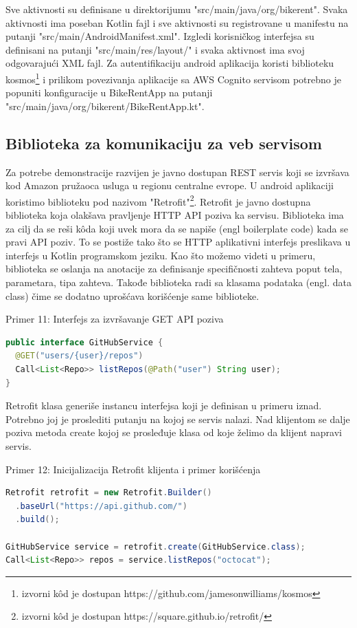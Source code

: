 \documentclass[12pt,oneside]{memoir}
\begin{document}
Sve aktivnosti su definisane u direktorijumu "src/main/java/org/bikerent". Svaka aktivnosti ima poseban Kotlin fajl i sve aktivnosti su registrovane u manifestu na putanji "src/main/AndroidManifest.xml". Izgledi korisničkog interfejsa su definisani na putanji "src/main/res/layout/" i svaka aktivnost ima svoj odgovarajući XML fajl. Za autentifikaciju android aplikacija koristi biblioteku kosmos\footnote{izvorni kôd je dostupan https://github.com/jamesonwilliams/kosmos} i prilikom povezivanja aplikacije sa AWS Cognito servisom potrebno je popuniti konfiguracije u BikeRentApp na putanji "src/main/java/org/bikerent/BikeRentApp.kt".
 
\subsection{Biblioteka za komunikaciju za veb servisom}
 
Za potrebe demonstracije razvijen je javno dostupan REST servis koji se izvršava kod Amazon pružaoca usluga u regionu centralne evrope. U android aplikaciji koristimo biblioteku pod nazivom "Retrofit"\footnote{izvorni kôd je dostupan https://square.github.io/retrofit/}. Retrofit je javno dostupna biblioteka koja olakšava pravljenje HTTP API poziva ka servisu. Biblioteka ima za cilj da se reši kôda koji uvek mora da se napiše (engl boilerplate code) kada se pravi API poziv. To se postiže tako što se HTTP aplikativni interfejs preslikava u interfejs u Kotlin programskom jeziku. Kao što možemo videti u primeru, biblioteka se oslanja na anotacije za definisanje specifičnosti zahteva poput tela, parametara, tipa zahteva. Takođe biblioteka radi sa klasama podataka (engl. data class) čime se dodatno uprošćava korišćenje same biblioteke.

\begin{center} Primer 11: Interfejs za izvršavanje GET API poziva\end{center}
\begin{lstlisting}[language=Java]
public interface GitHubService {
  @GET("users/{user}/repos")
  Call<List<Repo>> listRepos(@Path("user") String user);
}
\end{lstlisting}


Retrofit klasa generiše instancu interfejsa koji je definisan u primeru iznad. Potrebno joj je proslediti putanju na kojoj se servis nalazi. Nad klijentom se dalje poziva metoda create kojoj se prosleđuje klasa od koje želimo da klijent napravi servis.
\begin{center} Primer 12: Inicijalizacija Retrofit klijenta i primer korišćenja\end{center}
\begin{lstlisting}[language=Java]
Retrofit retrofit = new Retrofit.Builder()
  .baseUrl("https://api.github.com/")
  .build();

GitHubService service = retrofit.create(GitHubService.class);
Call<List<Repo>> repos = service.listRepos("octocat");
\end{lstlisting}
\end{document}
